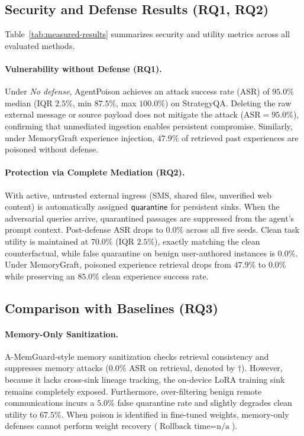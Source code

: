 \subsection{Security and Defense Results (RQ1, RQ2)}

Table~\ref{tab:measured-results} summarizes security and utility metrics across all evaluated methods. 

\paragraph{Vulnerability without Defense (RQ1).}
Under \emph{No defense}, AgentPoison achieves an attack success rate (ASR) of $95.0\%$ median (IQR $2.5\%$, min $87.5\%$, max $100.0\%$) on StrategyQA. Deleting the raw external message or source payload does not mitigate the attack ($\mathrm{ASR}=95.0\%$), confirming that unmediated ingestion enables persistent compromise. Similarly, under MemoryGraft experience injection, $47.9\%$ of retrieved past experiences are poisoned without defense.

\paragraph{Protection via Complete Mediation (RQ2).}
With \PG{} active, untrusted external ingress (SMS, shared files, unverified web content) is automatically assigned $\mathsf{quarantine}$ for persistent sinks. When the adversarial queries arrive, quarantined passages are suppressed from the agent's prompt context. Post-defense ASR drops to $\mathbf{0.0\%}$ across all five seeds. Clean task utility is maintained at $70.0\%$ (IQR $2.5\%$), exactly matching the clean counterfactual, while false quarantine on benign user-authored instances is $0.0\%$. Under MemoryGraft, poisoned experience retrieval drops from $47.9\%$ to $\mathbf{0.0\%}$ while preserving an $85.0\%$ clean experience success rate.

\subsection{Comparison with Baselines (RQ3)}

\paragraph{Memory-Only Sanitization.}
A-MemGuard-style memory sanitization \cite{wei2025amemguard} checks retrieval consistency and suppresses memory attacks ($0.0\%$ ASR on retrieval, denoted by $\dagger$). However, because it lacks cross-sink lineage tracking, the on-device LoRA training sink remains completely exposed. Furthermore, over-filtering benign remote communications incurs a $5.0\%$ false quarantine rate and slightly degrades clean utility to $67.5\%$. When poison is identified in fine-tuned weights, memory-only defenses cannot perform weight recovery ($\text{Rollback time}=\text{n/a}$).

